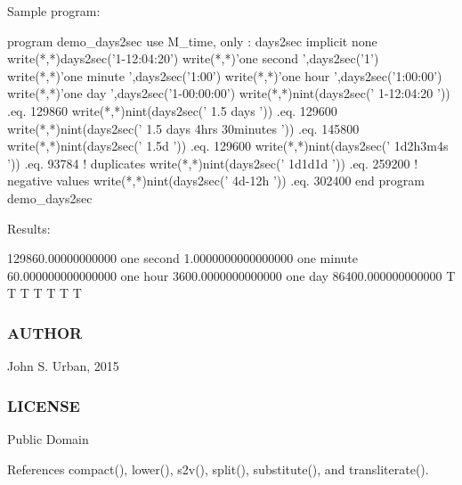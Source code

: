 \begin{DoxyVerb}Sample program:

 program demo_days2sec
 use M_time, only : days2sec
 implicit none
    write(*,*)days2sec('1-12:04:20')
    write(*,*)'one second ',days2sec('1')
    write(*,*)'one minute ',days2sec('1:00')
    write(*,*)'one hour ',days2sec('1:00:00')
    write(*,*)'one day ',days2sec('1-00:00:00')
    write(*,*)nint(days2sec(' 1-12:04:20              ')) .eq. 129860
    write(*,*)nint(days2sec(' 1.5 days                ')) .eq. 129600
    write(*,*)nint(days2sec(' 1.5 days 4hrs 30minutes ')) .eq. 145800
    write(*,*)nint(days2sec(' 1.5d                    ')) .eq. 129600
    write(*,*)nint(days2sec(' 1d2h3m4s                ')) .eq. 93784
    ! duplicates
    write(*,*)nint(days2sec(' 1d1d1d                  ')) .eq. 259200
    ! negative values
    write(*,*)nint(days2sec(' 4d-12h                  ')) .eq. 302400
 end program demo_days2sec

Results:

 129860.00000000000
 one second    1.0000000000000000
 one minute    60.000000000000000
 one hour    3600.0000000000000
 one day    86400.000000000000
 T
 T
 T
 T
 T
 T
 T
\end{DoxyVerb}


\subsubsection*{A\+U\+T\+H\+OR}

John S. Urban, 2015 \subsubsection*{L\+I\+C\+E\+N\+SE}

Public Domain 

References compact(), lower(), s2v(), split(), substitute(), and transliterate().

